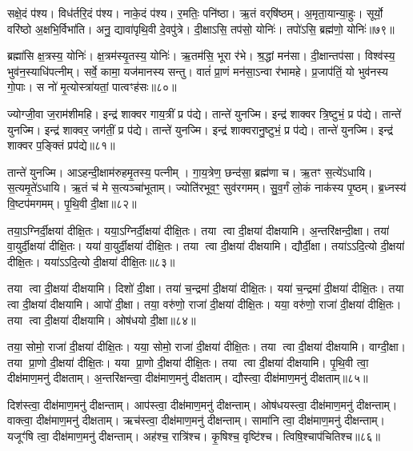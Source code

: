 सक्षे॒दं प॑श्य।
विध॑र्तरि॒दं प॑श्य।
नाके॒दं प॑श्य।
र॒मतिः॒ पनि॑ष्ठा।
ऋ॒तं वर्‌\mbox{}षि॑ष्ठम्।
अ॒मृता॒यान्या॒हुः।
सूर्यो॒ वरि॑ष्ठो अ॒क्षभि॒र्विभा॑ति।
अनु॒ द्यावा॑पृथि॒वी दे॒वपु॑त्रे।
दी॒क्षाऽसि॒ तप॑सो॒ योनिः॑।
तपो॑ऽसि॒ ब्रह्म॑णो॒ योनिः॑॥७९॥

ब्रह्मा॑सि क्ष॒त्रस्य॒ योनिः॑।
क्ष॒त्रम॑स्यृ॒तस्य॒ योनिः॑।
ऋ॒तम॑सि॒ भूरा र॑भे।
श्र॒द्धां मन॑सा।
दी॒क्षान्तप॑सा।
विश्व॑स्य॒ भुव॑न॒स्याधि॑पत्नीम्।
सर्वे॒ कामा॒ यज॑मानस्य सन्तु।
वातं॑ प्रा॒णं मन॑सा॒\-ऽन्वा र॑भामहे।
प्र॒जाप॑तिं॒ यो भुव॑नस्य गो॒पाः।
स नो॑ मृ॒त्योस्त्रा॑यतां॒ पात्वꣳह॑सः॥८०॥

ज्योग्जी॒वा ज॒राम॑शीमहि।
इन्द्र॑ शाक्वर गाय॒त्रीं प्र प॑द्ये।
तान्ते॑ युनज्मि।
इन्द्र॑ शाक्वर त्रि॒ष्टुभं॒ प्र प॑द्ये।
तान्ते॑ युनज्मि।
इन्द्र॑ शाक्वर॒ जग॑तीं॒ प्र प॑द्ये।
तान्ते॑ युनज्मि।
इन्द्र॑ शाक्वरानु॒ष्टुभं॒ प्र प॑द्ये।
तान्ते॑ युनज्मि।
इन्द्र॑ शाक्वर प॒ङ्क्तिं प्रप॑द्ये॥८१॥

तान्ते॑ युनज्मि।
आऽहन्दी॒क्षाम॑रुहमृ॒तस्य॒ पत्नीम्।
गा॒य॒त्रेण॒ छन्द॑सा॒ ब्रह्म॑णा च।
ऋ॒तꣳ स॒त्ये॑\-ऽधायि।
स॒त्यमृ॒ते॑\-ऽधायि।
ऋ॒तं च॑ मे स॒त्यञ्चा॑भूताम्।
ज्योति॑रभूव॒ꣳ॒ सुव॑रगमम्।
सु॒व॒र्गं लो॒कं नाक॑स्य पृ॒ष्ठम्।
ब्र॒ध्नस्य॑ वि॒ष्टप॑मगमम्।
पृ॒थि॒वी दी॒क्षा॥८२॥

तया॒ऽग्निर्दी॒क्षया॑ दीक्षि॒तः।
यया॒ऽग्निर्दी॒क्षया॑ दीक्षि॒तः।
तया त्वा दी॒क्षया॑ दीक्षयामि।
अ॒न्तरि॑क्षन्दी॒क्षा।
तया॑ वा॒युर्दी॒क्षया॑ दीक्षि॒तः।
यया॑ वा॒युर्दी॒क्षया॑ दीक्षि॒तः।
तया त्वा दी॒क्षया॑ दीक्षयामि।
द्यौर्दी॒क्षा।
तया॑ऽऽदि॒त्यो दी॒क्षया॑ दीक्षि॒तः।
यया॑ऽऽदि॒त्यो दी॒क्षया॑ दीक्षि॒तः॥८३॥

तया त्वा दी॒क्षया॑ दीक्षयामि।
दिशो॑ दी॒क्षा।
तया॑ च॒न्द्रमा॑ दी॒क्षया॑ दीक्षि॒तः।
यया॑ च॒न्द्रमा॑ दी॒क्षया॑ दीक्षि॒तः।
तया त्वा दी॒क्षया॑ दीक्षयामि।
आपो॑ दी॒क्षा।
तया॒ वरु॑णो॒ राजा॑ दी॒क्षया॑ दीक्षि॒तः।
यया॒ वरु॑णो॒ राजा॑ दी॒क्षया॑ दीक्षि॒तः।
तया त्वा दी॒क्षया॑ दीक्षयामि।
ओष॑धयो दी॒क्षा॥८४॥

तया॒ सोमो॒ राजा॑ दी॒क्षया॑ दीक्षि॒तः।
यया॒ सोमो॒ राजा॑ दी॒क्षया॑ दीक्षि॒तः।
तया त्वा दी॒क्षया॑ दीक्षयामि।
वाग्दी॒क्षा।
तया प्रा॒णो दी॒क्षया॑ दीक्षि॒तः।
यया प्रा॒णो दी॒क्षया॑ दीक्षि॒तः।
तया त्वा दी॒क्षया॑ दीक्षयामि।
पृ॒थि॒वी त्वा॒ दीक्ष॑माण॒मनु॑ दीक्षताम्।
अ॒न्तरि॑क्षन्त्वा॒ दीक्ष॑माण॒मनु॑ दीक्षताम्।
द्यौस्त्वा॒ दीक्ष॑माण॒मनु॑ दीक्षताम्॥८५॥

दिश॑स्त्वा॒ दीक्ष॑माण॒मनु॑ दीक्षन्ताम्।
आप॑स्त्वा॒ दीक्ष॑माण॒मनु॑ दीक्षन्ताम्।
ओष॑धयस्त्वा॒ दीक्ष॑माण॒मनु॑ दीक्षन्ताम्।
वाक्त्वा॒ दीक्ष॑माण॒मनु॑ दीक्षताम्।
ऋच॑स्त्वा॒ दीक्ष॑माण॒मनु॑ दीक्षन्ताम्।
सामा॑नि त्वा॒ दीक्ष॑माण॒मनु॑ दीक्षन्ताम्।
यजूꣳ॑षि त्वा॒ दीक्ष॑माण॒मनु॑ दीक्षन्ताम्।
अह॑श्च॒ रात्रि॑श्च।
कृ॒षिश्च॒ वृष्टि॑श्च।
त्विषि॒श्चाप॑चितिश्च॥८६॥

